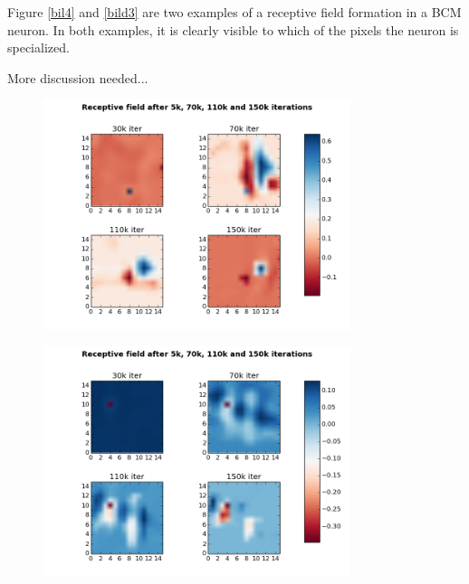 Figure \ref{bil4} and \ref{bild3} are two examples of a receptive field formation in a BCM neuron. In both examples, it is clearly visible to which of the pixels the neuron is specialized.

More discussion needed...

\begin{figure}[H]
 \centering
 \includegraphics[width = 0.8\textwidth]{../results/exercise3b}
 \caption{}
 \label{fig:bild3}
\end{figure}

\begin{figure}[H]
 \centering
 \includegraphics[width = 0.8\textwidth]{../results/exercise3c}
 \caption{}
 \label{fig:bild4}
\end{figure}



